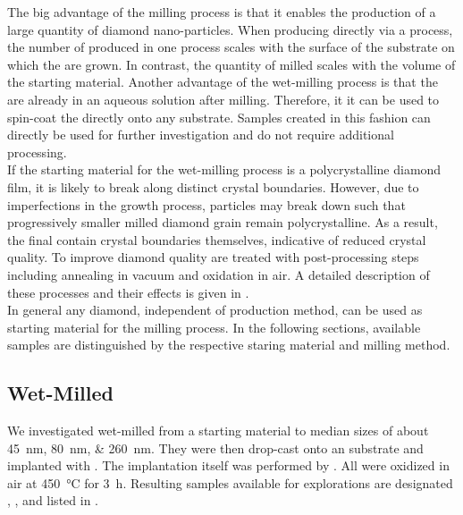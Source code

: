 	The big advantage of the milling process is that it enables the production of a large quantity of diamond nano-particles.
	When producing \nds directly via a \CVD process, the number of produced \nds in one process scales with the surface of the substrate on which the \nds are grown.
	In contrast, the quantity of milled \nds scales with the volume of the starting material.
	Another advantage of the wet-milling process is that the \nds are already in an aqueous solution after milling.
	Therefore, it it can be used to spin-coat the \nds directly onto any substrate. Samples created in this fashion can directly be used for further investigation and do not require additional processing.
	\\
	If the starting material for the wet-milling process is a polycrystalline diamond film, it is likely to break along distinct crystal boundaries.
	However, due to imperfections in the growth process, particles may break down such that progressively smaller milled diamond grain remain polycrystalline.
	As a result, the final \nds contain crystal boundaries themselves, indicative of reduced crystal quality.
	To improve diamond quality \nds are treated with post-processing steps including annealing in vacuum and oxidation in air.
	A detailed description of these processes and their effects is given in .
	\\
	In general any diamond, independent of production method, can be used as starting material for the milling process.
	In the following sections, available samples are distinguished by the respective staring material and milling method.

	\subsection{Wet-Milled \HPHT \Nds}\label{subsec::milled_hpht_nds}
		We investigated \nds wet-milled from a \HPHT starting material to median sizes of about \SIlist{45;80;260}{nm}.
		They were then drop-cast onto an \ir substrate and implanted with  . The implantation itself was performed by \rogalla.
		All \HPHT \nds were oxidized in air at \SI{450}{\celsius} for \SI{3}{\hour}. Resulting samples available for explorations are designated \hphtimpfortyfive, \hphtimpeighty, \hphtimptwosixty and listed in .

